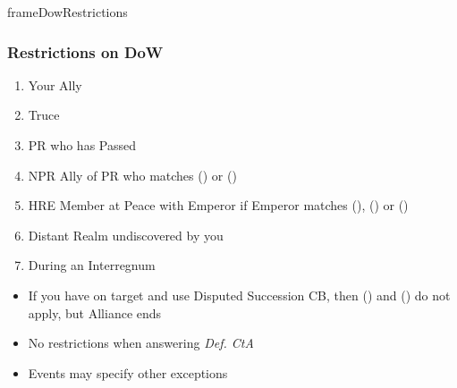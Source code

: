 \documentclass[10pt]{article}
\newlength{\fhDowRestrictions} \setlength\fhDowRestrictions{15\baselineskip}
\begin{document}
\addbackground
\addfooter

\begin{dynamiccontents*}{frameDowRestrictions}\begin{eubox}{\fhDowRestrictions}
	\subsubsection*{Restrictions on DoW }
	\begin{enumerate}[label=\strong{\alph*}.]
		\item Your Ally
		\item Truce
		\item PR who has Passed
		\item NPR Ally of PR who matches () or ()
		\item HRE Member at Peace with Emperor if Emperor matches (), () or ()
		\item Distant Realm undiscovered by you
		\item During an Interregnum
	\end{enumerate}
	\begin{itemize}
		\item If you have \disputedsuccession on target and use Disputed Succession CB, then () and () do not apply, but Alliance ends
		\item No restrictions when answering \emph{Def. CtA}
		\item Events may specify other exceptions
	\end{itemize}
\end{eubox}\end{dynamiccontents*}
\end{document}
